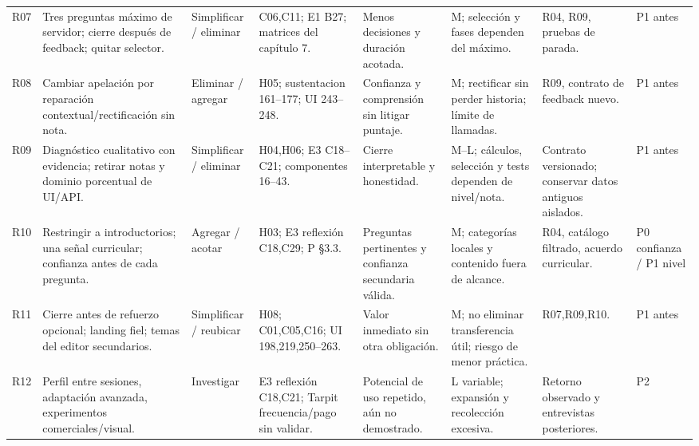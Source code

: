 \documentclass[11pt,a4paper]{report}
\begin{document}
\begin{landscape}
\begin{longtable}{P{0.8cm}P{4cm}P{2cm}P{4.1cm}P{3.4cm}P{3.5cm}P{3.4cm}P{1.7cm}}
R07 & Tres preguntas máximo de servidor; cierre después de feedback; quitar selector. & Simplificar / eliminar & C06,C11; E1 B27; matrices del capítulo 7. & Menos decisiones y duración acotada. & M; selección y fases dependen del máximo. & R04, R09, pruebas de parada. & P1 antes\\
R08 & Cambiar apelación por reparación contextual/rectificación sin nota. & Eliminar / agregar & H05; sustentacion 161--177; UI 243--248. & Confianza y comprensión sin litigar puntaje. & M; rectificar sin perder historia; límite de llamadas. & R09, contrato de feedback nuevo. & P1 antes\\
R09 & Diagnóstico cualitativo con evidencia; retirar notas y dominio porcentual de UI/API. & Simplificar / eliminar & H04,H06; E3 C18--C21; componentes 16--43. & Cierre interpretable y honestidad. & M--L; cálculos, selección y tests dependen de nivel/nota. & Contrato versionado; conservar datos antiguos aislados. & P1 antes\\
R10 & Restringir a introductorios; una señal curricular; confianza antes de cada pregunta. & Agregar / acotar & H03; E3 reflexión C18,C29; P §3.3. & Preguntas pertinentes y confianza secundaria válida. & M; categorías locales y contenido fuera de alcance. & R04, catálogo filtrado, acuerdo curricular. & P0 confianza / P1 nivel\\
R11 & Cierre antes de refuerzo opcional; landing fiel; temas del editor secundarios. & Simplificar / reubicar & H08; C01,C05,C16; UI 198,219,250--263. & Valor inmediato sin otra obligación. & M; no eliminar transferencia útil; riesgo de menor práctica. & R07,R09,R10. & P1 antes\\
R12 & Perfil entre sesiones, adaptación avanzada, experimentos comerciales/visual. & Investigar & E3 reflexión C18,C21; Tarpit frecuencia/pago sin validar. & Potencial de uso repetido, aún no demostrado. & L variable; expansión y recolección excesiva. & Retorno observado y entrevistas posteriores. & P2\\\bottomrule
\end{longtable}
\end{landscape}
\end{document}
